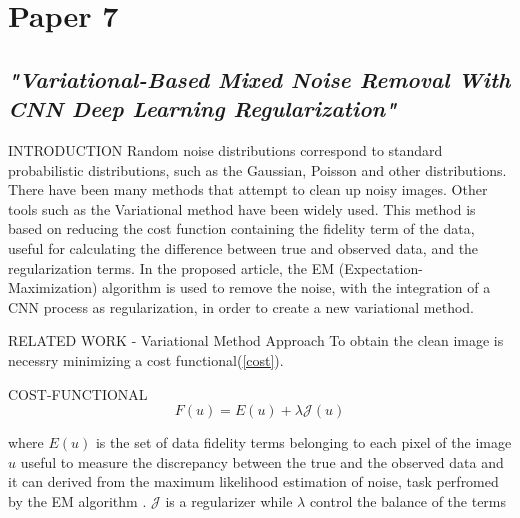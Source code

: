\section{Paper 7}
\subsection{\emph{"Variational-Based Mixed Noise Removal With CNN Deep Learning Regularization"}}

\begin{frame}{INTRODUCTION}
    Random noise distributions correspond to standard probabilistic distributions, 
    such as the Gaussian, Poisson and other distributions. There have 
    been many methods that attempt to clean up noisy images. Other tools such as the Variational method have been widely used. 
    This method is based on reducing the cost function containing the fidelity 
    term of the data, useful for calculating the difference between true and observed 
    data, and the regularization terms. In the 
    proposed article, the EM (Expectation-Maximization) algorithm is used to 
    remove the noise, with the integration of a CNN process as regularization, 
    in order to create a new variational method.
\end{frame}

\begin{frame}{RELATED WORK - Variational Method Approach}
    To obtain the clean image is necessry minimizing a cost functional(\ref{cost}).
    \begin{block}{COST-FUNCTIONAL}
        \begin{equation}\label{cost}
            F(u) = E(u)+\lambda\mathcal{J}(u)
        \end{equation}
    \end{block}
    where $E(u)$ is the set of data fidelity terms belonging to each pixel of the 
    image $u$ useful to measure the discrepancy between the true and the 
    observed data and it can derived from the maximum likelihood estimation 
    of noise, task perfromed by the EM algorithm .  $\mathcal{J}$ is a regularizer while $ \lambda $ 
    control the balance of the terms
\end{frame}

